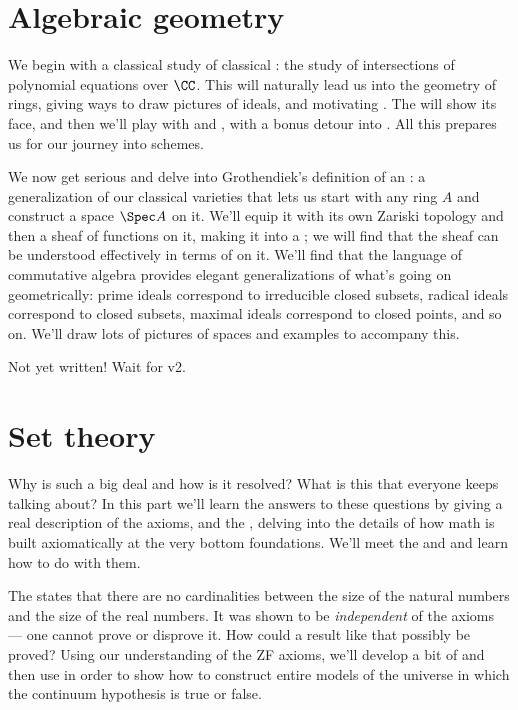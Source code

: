 \section{Algebraic geometry}
\begin{itemize}
We begin with a classical study of classical :
the study of intersections of polynomial equations over $\CC$.
This will naturally lead us into the geometry of rings,
giving ways to draw pictures of ideals,
and motivating .
The  will show its face,
and then we'll play with 
and ,
with a bonus detour into .
All this prepares us for our journey into schemes.

We now get serious and delve into Grothendiek's definition of
an :
a generalization of our classical varieties
that lets us start with any ring $A$
and construct a space $\Spec A$ on it.
We'll equip it with its own Zariski topology
and then a sheaf of functions on it,
making it into a ;
we will find that the sheaf can be understood
effectively in terms of  on it.
We'll find that the language of commutative algebra provides
elegant generalizations of what's going on geometrically:
prime ideals correspond to irreducible closed subsets,
radical ideals correspond to closed subsets,
maximal ideals correspond to closed points, and so on.
We'll draw lots of pictures of spaces and examples to accompany this.

Not yet written! Wait for v2.
\end{itemize}

\section{Set theory}
\begin{itemize}
Why is  such a big deal
and how is it resolved?
What is this 
that everyone keeps talking about?
In this part we'll learn the answers to these questions
by giving a real description of the 
axioms, and the ,
delving into the details of how math is built axiomatically
at the very bottom foundations.
We'll meet the  and 
and learn how to do  with them.

The 
states that there are no cardinalities
between the size of the natural numbers and the size of the real numbers.
It was shown to be \emph{independent} of the axioms ---
one cannot prove or disprove it.
How could a result like that possibly be proved?
Using our understanding of the ZF axioms,
we'll develop a bit of 
and then use  in order to show
how to construct entire models of the universe
in which the continuum hypothesis is true or false.
\end{itemize}
